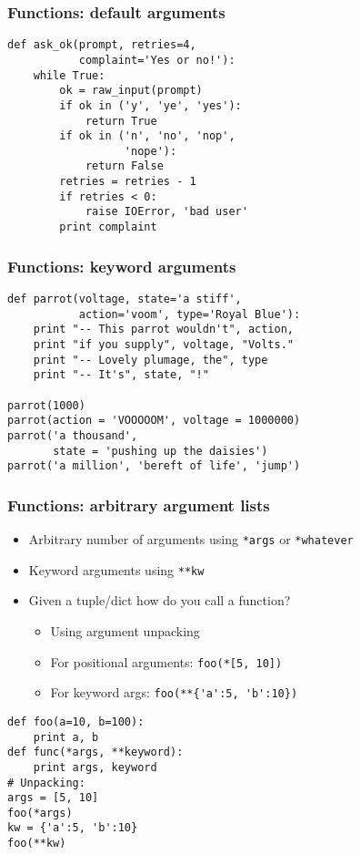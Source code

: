 \documentclass[14pt,compress]{beamer}
\newcounter{time}
\newcommand{\inctime}[1]{\addtocounter{time}{#1}{\tiny \thetime\ m}}
\begin{document}
\begin{frame}[fragile]
  \frametitle{Functions: default arguments}
  \small
  \begin{lstlisting}
def ask_ok(prompt, retries=4,
           complaint='Yes or no!'):
    while True:
        ok = raw_input(prompt)
        if ok in ('y', 'ye', 'yes'): 
            return True
        if ok in ('n', 'no', 'nop',
                  'nope'): 
            return False
        retries = retries - 1
        if retries < 0: 
            raise IOError, 'bad user'
        print complaint
  \end{lstlisting}
\end{frame}

\begin{frame}[fragile]
  \frametitle{Functions: keyword arguments}
  \small
  \begin{lstlisting}
def parrot(voltage, state='a stiff', 
           action='voom', type='Royal Blue'):
    print "-- This parrot wouldn't", action,
    print "if you supply", voltage, "Volts."
    print "-- Lovely plumage, the", type
    print "-- It's", state, "!"

parrot(1000)
parrot(action = 'VOOOOOM', voltage = 1000000)
parrot('a thousand',
       state = 'pushing up the daisies')
parrot('a million', 'bereft of life', 'jump')
\end{lstlisting}
\end{frame}

\begin{frame}[fragile]
  \frametitle{Functions: arbitrary argument lists}
  \begin{itemize}
  \item Arbitrary number of arguments using \verb+*args+ or
    \verb+*whatever+
  \item Keyword arguments using \verb+**kw+
  \item Given a tuple/dict how do you call a function?
    \begin{itemize}
    \item Using argument unpacking
    \item For positional arguments: \verb+foo(*[5, 10])+
    \item For keyword args: \verb+foo(**{'a':5, 'b':10})+
    \end{itemize}
  \end{itemize}
\end{frame}

  \begin{frame}[fragile]
\begin{lstlisting}
def foo(a=10, b=100):
    print a, b
def func(*args, **keyword):
    print args, keyword
# Unpacking:
args = [5, 10]
foo(*args)
kw = {'a':5, 'b':10}
foo(**kw)
\end{lstlisting}
    \inctime{15} 
\end{frame}
\end{document}
